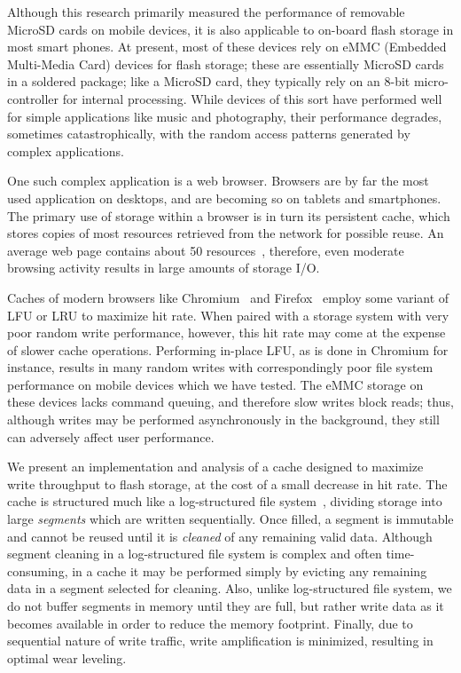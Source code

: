 \documentclass{sig-alternate}
\begin{document}
Although this research primarily measured the performance of removable MicroSD
cards on mobile devices, it is also applicable to on-board flash storage in most
smart phones. At present, most of these devices rely on eMMC (Embedded
Multi-Media Card) devices for flash storage; these are essentially MicroSD cards
in a soldered package; like a MicroSD card, they typically rely on an 8-bit
micro-controller for internal processing.  While devices of this sort have
performed well for simple applications like music and photography, their
performance degrades, sometimes catastrophically, with the random access
patterns generated by complex applications.

One such complex application is a web browser.  Browsers are by far the most
used application on desktops, and are becoming so on tablets and smartphones.
The primary use of storage within a browser is in turn its persistent cache,
which stores copies of most resources retrieved from the network for possible
reuse.  An average web page contains about 50
resources~\cite{google-web-metrics}, therefore, even moderate browsing activity
results in large amounts of storage I/O.

Caches of modern browsers like Chromium~\cite{chromium} and
Firefox~\cite{Firefox} employ some variant of LFU or LRU to maximize hit rate.
When paired with a storage system with very poor random write performance,
however, this hit rate may come at the expense of slower cache operations.
Performing in-place LFU, as is done in Chromium for instance, results in many
random writes with correspondingly poor file system performance on mobile
devices which we have tested. The eMMC storage on these devices lacks command
queuing, and therefore slow writes block reads; thus, although writes may be
performed asynchronously in the background, they still can adversely affect user
performance.

We present an implementation and analysis of a cache designed to maximize write
throughput to flash storage, at the cost of a small decrease in hit rate. The
cache is structured much like a log-structured file system~\cite{rosenblum92},
dividing storage into large \emph{segments} which are written sequentially.
Once filled, a segment is immutable and cannot be reused until it is
\emph{cleaned} of any remaining valid data. Although segment cleaning in a
log-structured file system is complex and often time-consuming, in a cache it
may be performed simply by evicting any remaining data in a segment selected for
cleaning.  Also, unlike log-structured file system, we do not buffer segments in
memory until they are full, but rather write data as it becomes available in
order to reduce the memory footprint.  Finally, due to sequential nature of
write traffic, write amplification is minimized, resulting in optimal wear
leveling.
\end{document}
